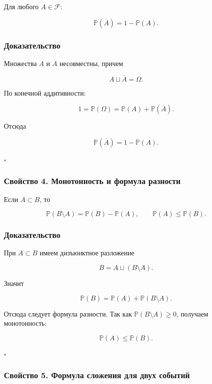 \documentclass[
  11pt,
  a4paper,
]{article}
\begin{document}
Для любого \(A\in\mathcal F\):

\[
\mathbb P(\overline{A})=1-\mathbb P(A).
\]

\subsubsection{Доказательство}\label{ux434ux43eux43aux430ux437ux430ux442ux435ux43bux44cux441ux442ux432ux43e-2}

Множества \(A\) и \(\overline{A}\) несовместны, причем

\[
A\sqcup \overline{A}=\Omega.
\]

По конечной аддитивности:

\[
1=\mathbb P(\Omega)=\mathbb P(A)+\mathbb P(\overline{A}).
\]

Отсюда

\[
\mathbb P(\overline{A})=1-\mathbb P(A).
\]

\(\square\)

\subsubsection{Свойство 4. Монотонность и формула
разности}\label{ux441ux432ux43eux439ux441ux442ux432ux43e-4.-ux43cux43eux43dux43eux442ux43eux43dux43dux43eux441ux442ux44c-ux438-ux444ux43eux440ux43cux443ux43bux430-ux440ux430ux437ux43dux43eux441ux442ux438}

Если \(A\subset B\), то

\[
\mathbb P(B\setminus A)=\mathbb P(B)-\mathbb P(A),
\qquad
\mathbb P(A)\le \mathbb P(B).
\]

\subsubsection{Доказательство}\label{ux434ux43eux43aux430ux437ux430ux442ux435ux43bux44cux441ux442ux432ux43e-3}

При \(A\subset B\) имеем дизъюнктное разложение

\[
B=A\sqcup(B\setminus A).
\]

Значит

\[
\mathbb P(B)=\mathbb P(A)+\mathbb P(B\setminus A).
\]

Отсюда следует формула разности. Так как
\(\mathbb P(B\setminus A)\ge0\), получаем монотонность:

\[
\mathbb P(A)\le\mathbb P(B).
\]

\(\square\)

\subsubsection{Свойство 5. Формула сложения для двух
событий}\label{ux441ux432ux43eux439ux441ux442ux432ux43e-5.-ux444ux43eux440ux43cux443ux43bux430-ux441ux43bux43eux436ux435ux43dux438ux44f-ux434ux43bux44f-ux434ux432ux443ux445-ux441ux43eux431ux44bux442ux438ux439}
\end{document}
